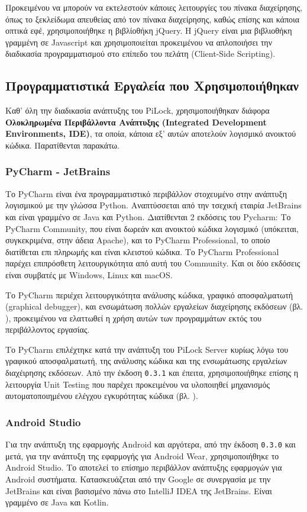  		Προκειμένου να μπορούν να εκτελεστούν κάποιες λειτουργίες του πίνακα διαχείρησης, όπως το ξεκλείδωμα απευθείας από τον πίνακα διαχείρησης, καθώς επίσης και κάποια οπτικά εφέ, χρησιμοποιήθηκε η βιβλίοθήκη jQuery. H jQuery είναι μια βιβλιοθήκη γραμμένη σε Javascript και χρησιμοποιείται προκειμένου να απλοποιήσει την διαδικασία προγραμματισμού στο επίπεδο του πελάτη (Client-Side Scripting).

 	\subsection{Προγραμματιστικά Εργαλεία που Χρησιμοποιήθηκαν}
 		Καθ' όλη την διαδικασία ανάπτυξης του PiLock, χρησιμοποιήθηκαν διάφορα \textbf{Ολοκληρωμένα Περιβάλλοντα Ανάπτυξης (Integrated Development Environments, IDE)}, τα οποία, κάποια εξ' αυτών αποτελούν λογισμικό ανοικτού κώδικα. Παρατίθενται παρακάτω.

 		\subsubsection{PyCharm - JetBrains}
 			Το PyCharm είναι ένα προγραμματιστικό περιβάλλον στοχευμένο στην ανάπτυξη λογισμικού με την γλώσσα Python. Αναπτύσσεται από την τσεχική εταιρία JetBrains και είναι γραμμένο σε Java και Python. Διατίθενται 2 εκδόσεις του Pycharm: Το PyCharm Community, που είναι δωρεάν και ανοικτού κώδικα λογισμικό (υπόκειται, συγκεκριμένα, στην άδεια Apache), και το PyCharm Professional, το οποίο διατίθεται επι πληρωμής και είναι κλειστού κώδικα. Το PyCharm Professional παρέχει επιπρόσθετη λειτουργικότητα από αυτή του Community. Και οι δύο εκδόσεις είναι συμβατές με Windows, Linux και macOS.

 			Το PyCharm περιέχει λειτουργικότητα ανάλυσης κώδικα, γραφικό αποσφαλματωτή (graphical debugger), και ενσωμάτωση πολλών εργαλείων διαχείρησης εκδόσεων (βλ. ), προκειμένου να ελαττωθεί η χρήση αυτών των προγραμμάτων εκτός του περιβάλλοντος εργασίας.

 			Το PyCharm επιλέχτηκε κατά την ανάπτυξη του PiLock Server κυρίως λόγω του γραφικού αποσφαλματωτή, της ανάλυσης κώδικα και της ενσωμάτωσης εργαλείων διαχέιρησης εκδόσεων. Από την έκδοση \verb|0.3.1| και έπειτα, χρησιμοποιήθηκε επίσης η λειτουργία Unit Testing που παρέχει προκειμένου να υλοποιηθεί μηχανισμός αυτοματοποιημένου ελέγχου εγκυρότητας κώδικα (βλ. ).

 		\subsubsection{Android Studio}
 			Για την ανάπτυξη της εφαρμογής Android και αργότερα, από την έκδοση \verb|0.3.0| και μετά, για την ανάπτυξη της εφαρμογής για Android Wear, χρησιμοποιήθηκε το Android Studio. Το  αποτελεί το επίσημο περιβάλλον ανάπτυξης εφαρμογών για Android συστήματα. Κατασκευάζεται από την Google σε συνεργασία με την JetBrains και είναι βασισμένο πάνω στο IntelliJ IDEA της JetBrains. Είναι γραμμένο σε Java και Kotlin.

